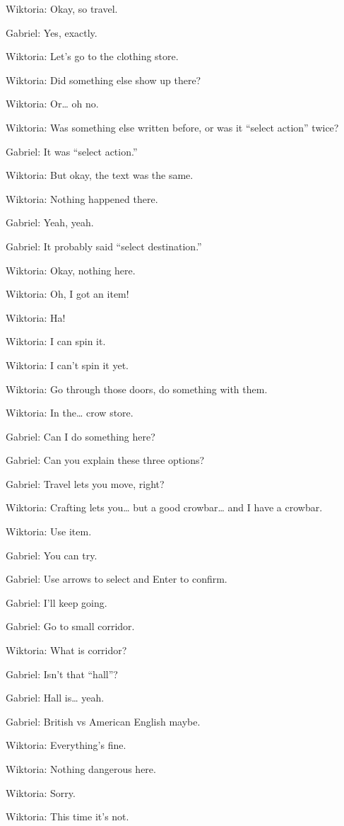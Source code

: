 Wiktoria: Okay, so travel.

Gabriel: Yes, exactly.

Wiktoria: Let’s go to the clothing store.

Wiktoria: Did something else show up there?

Wiktoria: Or… oh no.

Wiktoria: Was something else written before, or was it “select action” twice?

Gabriel: It was “select action.”

Wiktoria: But okay, the text was the same.

Wiktoria: Nothing happened there.

Gabriel: Yeah, yeah.

Gabriel: It probably said “select destination.”

Wiktoria: Okay, nothing here.

Wiktoria: Oh, I got an item!

Wiktoria: Ha!

Wiktoria: I can spin it.

Wiktoria: I can’t spin it yet.

Wiktoria: Go through those doors, do something with them.

Wiktoria: In the… crow store.

Gabriel: Can I do something here?

Gabriel: Can you explain these three options?

Gabriel: Travel lets you move, right?

Wiktoria: Crafting lets you… but a good crowbar… and I have a crowbar.

Wiktoria: Use item.

Gabriel: You can try.

Gabriel: Use arrows to select and Enter to confirm.

Gabriel: I’ll keep going.

Gabriel: Go to small corridor.

Wiktoria: What is corridor?

Gabriel: Isn’t that “hall”?

Gabriel: Hall is… yeah.

Gabriel: British vs American English maybe.

Wiktoria: Everything’s fine.

Wiktoria: Nothing dangerous here.

Wiktoria: Sorry.

Wiktoria: This time it’s not.

